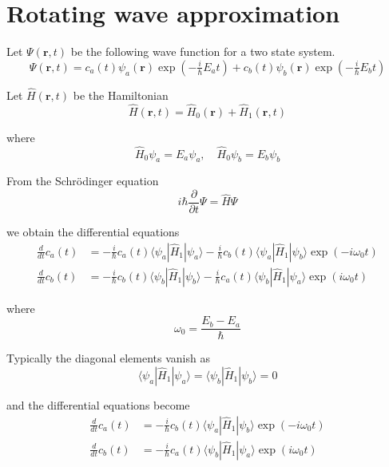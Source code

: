 

\section*{Rotating wave approximation}

Let $\Psi(\mathbf r,t)$ be the following wave function for a two state system.
\begin{equation*}
\Psi(\mathbf r,t)
=c_a(t)\psi_a(\mathbf r)\exp(-\tfrac{i}{\hbar}E_at)
+c_b(t)\psi_b(\mathbf r)\exp(-\tfrac{i}{\hbar}E_bt)
\end{equation*}

Let $\hat H(\mathbf r,t)$ be the Hamiltonian
\begin{equation*}
\hat H(\mathbf r,t)=\hat H_0(\mathbf r)+\hat H_1(\mathbf r,t)
\end{equation*}

where
\begin{equation*}
\hat H_0\psi_a=E_a\psi_a,\quad\hat H_0\psi_b=E_b\psi_b
\end{equation*}

From the Schr\"odinger equation
\begin{equation*}
i\hbar\frac{\partial}{\partial t}\Psi=\hat H\Psi
\end{equation*}

we obtain the differential equations
\begin{equation*}
\begin{aligned}
\frac{d}{dt}c_a(t)&=-\frac{i}{\hbar}c_a(t)\langle\psi_a|\hat H_1|\psi_a\rangle
-\frac{i}{\hbar}c_b(t)\langle\psi_a|\hat H_1|\psi_b\rangle\exp(-i\omega_0t)
\\[1ex]
\frac{d}{dt}c_b(t)&=-\frac{i}{\hbar}c_b(t)\langle\psi_b|\hat H_1|\psi_b\rangle
-\frac{i}{\hbar}c_a(t)\langle\psi_b|\hat H_1|\psi_a\rangle\exp(i\omega_0t)
\end{aligned}
\end{equation*}

where
\begin{equation*}
\omega_0=\frac{E_b-E_a}{\hbar}
\end{equation*}

Typically the diagonal elements vanish as
\begin{equation*}
\langle\psi_a|\hat H_1|\psi_a\rangle=\langle\psi_b|\hat H_1|\psi_b\rangle=0
\end{equation*}

and the differential equations become
\begin{align*}
\frac{d}{dt}c_a(t)&=-\frac{i}{\hbar}c_b(t)\langle\psi_a|\hat H_1|\psi_b\rangle\exp(-i\omega_0t)
\tag{1}
\\[1ex]
\frac{d}{dt}c_b(t)&=-\frac{i}{\hbar}c_a(t)\langle\psi_b|\hat H_1|\psi_a\rangle\exp(i\omega_0t)
\tag{2}
\end{align*}

